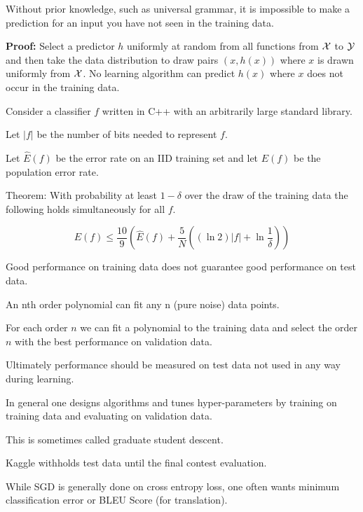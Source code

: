 {Without prior knowledge, such as universal grammar, it is impossible to make a prediction for an input you have not seen in the training data.


\vfill
{\bf Proof:} Select a predictor $h$ uniformly at random from all functions from ${\cal X}$ to ${\cal Y}$ and then take the data distribution to draw pairs $(x, h(x))$
where $x$ is drawn uniformly from ${\cal X}$.  No learning algorithm can predict $h(x)$ where $x$ does not occur in the training data.



Consider a classifier $f$ written in C++ with an arbitrarily large standard library.

\vfill
Let $|f|$ be the number of bits needed to represent $f$.

\vfill
Let $\hat{E}(f)$ be the error rate on an IID training set and let $E(f)$ be the population error rate.

\vfill
Theorem: With probability at least $1-\delta$ over the draw of the training data the following holds simultaneously for all $f$.

{\color{red} $$E(f) \leq \frac{10}{9}\left(\hat{E}(f) + \frac{5}{N}\left((\ln 2)|f| +\ln\frac{1}{\delta}\right)\right)$$}


Good performance on training data does not guarantee good performance on test data.

\vfill
An nth order polynomial can fit any n (pure noise) data points.

\vfill
For each order $n$ we can fit a polynomial to the training data and select the order $n$ with the best performance on validation data.

\vfill
Ultimately performance should be measured on test data not used in any way during learning.


In general one designs algorithms and tunes hyper-parameters by training on training data and evaluating on validation data.

\vfill
This is sometimes called graduate student descent.

\vfill
Kaggle withholds test data until the final contest evaluation.

While SGD is generally done on cross entropy loss, one often wants minimum classification error or BLEU Score (for translation).

}
